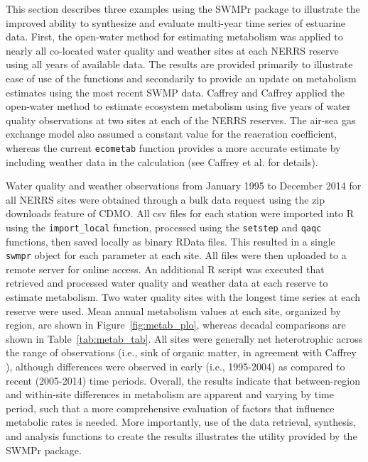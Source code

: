 This section describes three examples using the SWMPr package to illustrate the improved ability to synthesize and evaluate multi-year time series of estuarine data. First, the open-water method for estimating metabolism was applied to nearly all co-located water quality and weather sites at each NERRS reserve using all years of available data.  The results are provided primarily to illustrate ease of use of the functions and secondarily to provide an update on metabolism estimates using the most recent SWMP data.  Caffrey \cite{Caffrey03} and Caffrey \cite{Caffrey04} applied the open-water method to estimate ecosystem metabolism using five years of water quality observations at two sites at each of the NERRS reserves.  The air-sea gas exchange model also assumed a constant value for the reaeration coefficient, whereas the current \texttt{ecometab} function provides a more accurate estimate by including weather data in the calculation (see Caffrey et al. \cite{Caffrey14} for details).

Water quality and weather observations from January 1995 to December 2014 for all NERRS sites were obtained through a bulk data request using the zip downloads feature of CDMO.  All csv files for each station were imported into R using the \texttt{import\_local} function, processed using the \texttt{setstep} and \texttt{qaqc} functions, then saved locally as binary RData files. This resulted in a single \texttt{swmpr} object for each parameter at each site.  All files were then uploaded to a remote server for online access.  An additional R script was executed that retrieved and processed water quality and weather data at each reserve to estimate metabolism.  Two water quality sites with the longest time series at each reserve were used.  Mean annual metabolism values at each site, organized by region, are shown in Figure~\ref{fig:metab_plo}, whereas decadal comparisons are shown in Table~\ref{tab:metab_tab}.  All sites were generally net heterotrophic across the range of observations (i.e., sink of organic matter, in agreement with Caffrey \cite{Caffrey03}), although differences were observed in early (i.e., 1995-2004) as compared to recent (2005-2014) time periods. Overall, the results indicate that between-region and within-site differences in metabolism are apparent and varying by time period, such that a more comprehensive evaluation of factors that influence metabolic rates is needed.  More importantly, use of the data retrieval, synthesis, and analysis functions to create the results illustrates the utility provided by the SWMPr package.

